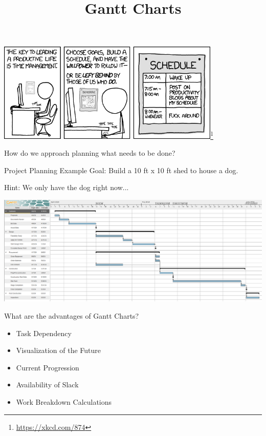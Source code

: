 \documentclass[aspectratio=169]{beamer}
\title{Gantt Charts}
\institute{Engineers for Exploration, UC San Diego}
\begin{document}
\maketitle
\begin{frame}
    \centering
    \includegraphics[width=0.8\textwidth]{xkcd_874_time_management.png}\footnote{\url{https://xkcd.com/874}}
\end{frame}
\begin{frame}
    How do we approach planning what needs to be done?
\end{frame}
\begin{frame}{Project Planning Example}
    Goal: Build a 10 ft x 10 ft shed to house a dog.

    Hint: We only have the dog right now...
\end{frame}
\begin{frame}
    \centering
    \includegraphics[width=\textwidth]{Construction-Gantt-chart-showing-task-lists-and-due-dates.png}
\end{frame}
\begin{frame}{What are the advantages of Gantt Charts?}
    \begin{itemize}
        \item Task Dependency
        \item Visualization of the Future
        \item Current Progression
        \item Availability of Slack
        \item Work Breakdown Calculations
    \end{itemize}
\end{frame}
\end{document}
